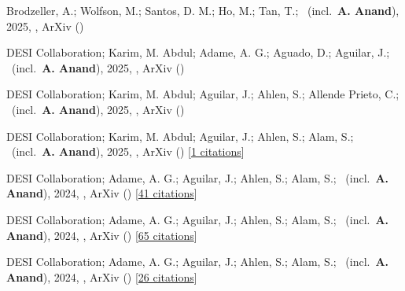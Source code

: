 \item[{\color{numcolor}\scriptsize10}] Brodzeller, A.; Wolfson, M.; Santos, D. M.; Ho, M.; Tan, T.; \etal\ (incl.\ \textbf{A. Anand}), 2025, , ArXiv ()

\item[{\color{numcolor}\scriptsize9}] DESI Collaboration; Karim, M. Abdul; Adame, A. G.; Aguado, D.; Aguilar, J.; \etal\ (incl.\ \textbf{A. Anand}), 2025, , ArXiv ()

\item[{\color{numcolor}\scriptsize8}] DESI Collaboration; Karim, M. Abdul; Aguilar, J.; Ahlen, S.; Allende Prieto, C.; \etal\ (incl.\ \textbf{A. Anand}), 2025, , ArXiv ()

\item[{\color{numcolor}\scriptsize7}] DESI Collaboration; Karim, M. Abdul; Aguilar, J.; Ahlen, S.; Alam, S.; \etal\ (incl.\ \textbf{A. Anand}), 2025, , ArXiv () [\href{https://ui.adsabs.harvard.edu/abs/2025arXiv250314738D}{1 citations}]

\item[{\color{numcolor}\scriptsize6}] DESI Collaboration; Adame, A. G.; Aguilar, J.; Ahlen, S.; Alam, S.; \etal\ (incl.\ \textbf{A. Anand}), 2024, , ArXiv () [\href{https://ui.adsabs.harvard.edu/abs/2024arXiv241112021D}{41 citations}]

\item[{\color{numcolor}\scriptsize5}] DESI Collaboration; Adame, A. G.; Aguilar, J.; Ahlen, S.; Alam, S.; \etal\ (incl.\ \textbf{A. Anand}), 2024, , ArXiv () [\href{https://ui.adsabs.harvard.edu/abs/2024arXiv241112022D}{65 citations}]

\item[{\color{numcolor}\scriptsize4}] DESI Collaboration; Adame, A. G.; Aguilar, J.; Ahlen, S.; Alam, S.; \etal\ (incl.\ \textbf{A. Anand}), 2024, , ArXiv () [\href{https://ui.adsabs.harvard.edu/abs/2024arXiv241112020D}{26 citations}]

